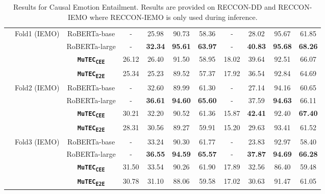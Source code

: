 \documentclass{article}
\newcommand{\subtwo}{\textbf{\texttt{MuTEC\textsubscript{CEE}}}}
\newcommand{\overall}{\textbf{\texttt{MuTEC\textsubscript{E2E}}}}
\begin{document}
\begin{table*}[t]
{\begin{tabular}{|c|c|c|c|c|c|c|c|c|c|c|}
\\ \cline{2-11} 
 & \multirow{3}{*}{Fold1 (IEMO)} & RoBERTa-base  & -     & 25.98 & 90.73 & 58.36 & -     & 28.02 & 95.67 & 61.85 \\ \cline{3-11} 
  &  & RoBERTa-large & -     & \textbf{32.34} & \textbf{95.61} & \textbf{63.97} & -     & \textbf{40.83} & \textbf{95.68} & \textbf{68.26} \\ \cline{3-11} 
&  & \subtwo          & 26.12 & 26.40 & 91.50 & 58.95 & 18.02 & 39.64 & 92.51 & 66.07 
\\ \cline{3-11} 
&  & \overall          & 25.34 & 25.23 & 89.52 & 57.37 & 17.92 & 36.54 & 92.84 & 64.69

\\ \cline{2-11} 
& \multirow{3}{*}{Fold2 (IEMO)} & RoBERTa-base  & -     & 32.60 & 89.99 & 61.30 & -     & 27.14 & 94.16 & 60.65 \\ \cline{3-11} 
  & & RoBERTa-large & -     & \textbf{36.61} & \textbf{94.60} & \textbf{65.60} & -     & 37.59 & \textbf{94.63} & 66.11 \\ \cline{3-11} 
 &  & \subtwo   & 30.21 & 32.20 & 90.52 & 61.36 & 15.87 & \textbf{42.41} & 92.40 & \textbf{67.40} 
 \\ \cline{3-11} 
&  & \overall          & 28.31 & 30.56 & 89.27 & 59.91 & 15.20 & 29.63 & 93.41 & 61.52
\\ \cline{2-11} 
    & \multirow{3}{*}{Fold3 (IEMO)} & RoBERTa-base  & -     & 33.24 & 90.30 & 61.77 & -     & 23.83 & 92.97 & 58.40 \\ \cline{3-11}  &                               & RoBERTa-large & -     & \textbf{36.55} & \textbf{94.59} & \textbf{65.57} & -     & \textbf{37.87} & \textbf{94.69} & \textbf{66.28} \\ \cline{3-11} 
   &   & \subtwo & 31.50 & 33.54 & 90.26 & 61.90 & 17.89 & 32.56 & 86.40 & 59.48 
   \\ \cline{3-11} 
&  & \overall          & 30.78 & 31.10 & 88.06 & 59.58 & 17.02 & 30.63 & 91.47 & 61.05
   \\ \hline

\end{tabular}
}
\vspace{0.5mm}
\caption{Results for Causal Emotion Entailment. Results are provided on RECCON-DD and RECCON-IEMO where RECCON-IEMO is only used during inference.}
\label{tab:sub2}
\vspace{-5mm}
\end{table*}
\end{document}
